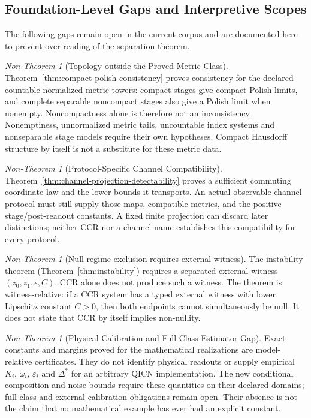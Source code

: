 \documentclass[11pt,a4paper]{article}
\theoremstyle{plain}
\theoremstyle{definition}
\theoremstyle{remark}
\newtheorem{nontheorem}[theorem]{Non-Theorem}
\begin{document}
\subsection{Foundation-Level Gaps and Interpretive Scopes}\label{sec:gap-nonclaims}

The following gaps remain open in the current corpus and are documented here to prevent over-reading of the separation theorem.

\begin{nontheorem}[Topology outside the Proved Metric Class]\label{nonthm:topology}
Theorem~\ref{thm:compact-polish-consistency} proves consistency for the
declared countable normalized metric towers: compact stages give compact
Polish limits, and complete separable noncompact stages also give a Polish
limit when nonempty. Noncompactness alone is therefore not an inconsistency.
Nonemptiness, unnormalized metric tails, uncountable index systems and
nonseparable stage models require their own hypotheses. Compact Hausdorff
structure by itself is not a substitute for these metric data.
\end{nontheorem}

\begin{nontheorem}[Protocol-Specific Channel Compatibility]\label{nonthm:channel-projection}
Theorem~\ref{thm:channel-projection-detectability} proves a sufficient
commuting coordinate law and the lower bounds it transports. An actual
observable-channel protocol must still supply those maps, compatible
metrics, and the positive stage/post-readout constants. A fixed finite
projection can discard later distinctions; neither CCR nor a channel name
establishes this compatibility for every protocol.
\end{nontheorem}

\begin{nontheorem}[Null-regime exclusion requires external witness]\label{nonthm:null-external}
The instability theorem (Theorem~\ref{thm:instability}) requires a separated external witness $(z_0,z_1,\epsilon,C)$. CCR alone does not produce such a witness. The theorem is witness-relative: if a CCR system has a typed external witness with lower Lipschitz constant $C>0$, then both endpoints cannot simultaneously be null. It does not state that CCR by itself implies non-nullity.
\end{nontheorem}

\begin{nontheorem}[Physical Calibration and Full-Class Estimator Gap]\label{nonthm:estimator-gap}
Exact constants and margins proved for the mathematical realizations are
model-relative certificates. They do not identify physical readouts or supply
empirical $K_i$, $\omega_i$, $\varepsilon_i$ and $\Delta^*$ for an arbitrary
QICN implementation. The new conditional composition and noise bounds
require these quantities on their declared domains; full-class and external
calibration obligations remain open. Their absence is not the claim that no
mathematical example has ever had an explicit constant.
\end{nontheorem}
\end{document}
